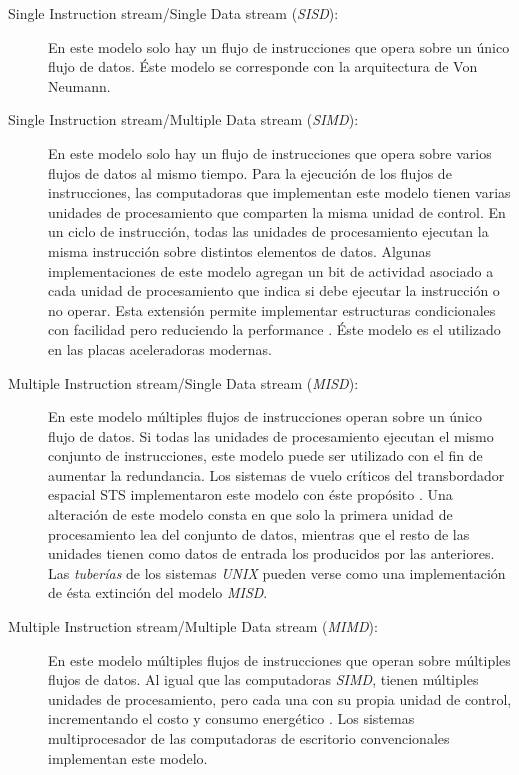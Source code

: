 \begin{description}

	\item[Single Instruction stream/Single Data stream (\emph{SISD}):] En
		este modelo solo hay un flujo de instrucciones que opera sobre
		un único flujo de datos. Éste modelo se corresponde con la
		arquitectura de Von Neumann.

	\item[Single Instruction stream/Multiple Data stream (\emph{SIMD}):] En
		este modelo solo hay un flujo de instrucciones que opera sobre
		varios flujos de datos al mismo tiempo. Para la ejecución de los
		flujos de instrucciones, las computadoras que implementan este
		modelo tienen varias unidades de procesamiento que comparten la
		misma unidad de control. En un ciclo de instrucción, todas las
		unidades de procesamiento ejecutan la misma instrucción sobre
		distintos elementos de datos. Algunas implementaciones de este
		modelo agregan un bit de actividad asociado a cada unidad de
		procesamiento que indica si debe ejecutar la instrucción o no
		operar. Esta extensión permite implementar estructuras
		condicionales con facilidad pero reduciendo la performance
		\cite{introToPC2002}. Éste modelo es el utilizado en las placas
		aceleradoras modernas.

	\item[Multiple Instruction stream/Single Data stream (\emph{MISD}):] En
		este modelo múltiples flujos de instrucciones operan sobre un
		único flujo de datos. Si todas las unidades de procesamiento
		ejecutan el mismo conjunto de instrucciones, este modelo puede
		ser utilizado con el fin de aumentar la redundancia. Los
		sistemas de vuelo críticos del transbordador espacial STS
		implementaron este modelo con éste propósito
		\cite{spaceShuttlePCS1984}. Una alteración de este modelo consta
		en que solo la primera unidad de procesamiento lea del conjunto
		de datos, mientras que el resto de las unidades tienen como
		datos de entrada los producidos por las anteriores. Las
		\emph{tuberías} de los sistemas \emph{UNIX} pueden verse como
		una implementación de ésta extinción del modelo \emph{MISD}.

	\item[Multiple Instruction stream/Multiple Data stream (\emph{MIMD}):] En
		este modelo múltiples flujos de instrucciones que operan sobre
		múltiples flujos de datos. Al igual que las computadoras
		\emph{SIMD}, tienen múltiples unidades de procesamiento, pero
		cada una con su propia unidad de control, incrementando el costo
		y consumo energético \cite{introToPC2002}. Los sistemas
		multiprocesador de las computadoras de escritorio convencionales
		implementan este modelo.

\end{description}


